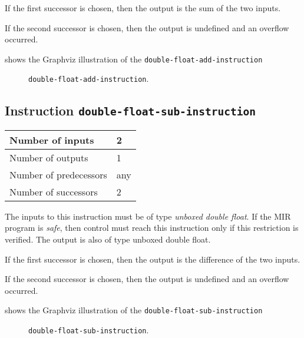 If the first successor is chosen, then the output is
the sum of the two inputs.  

If the second successor is chosen, then the output is undefined and an
overflow occurred. 

 shows the Graphviz illustration of the
\texttt{double-float-add-instruction}

\begin{figure}
\begin{center}
\end{center}
\caption{\label{fig-double-float-add-instruction}
\texttt{double-float-add-instruction}.}
\end{figure}

\subsection{Instruction \texttt{double-float-sub-instruction}}
\label{mir-instruction-double-float-sub}

\begin{tabular}{|l|l|}
\hline
Number of inputs & 2\\
\hline
Number of outputs & 1\\
\hline
Number of predecessors & any\\
\hline
Number of successors & 2\\
\hline
\end{tabular}

The inputs to this instruction must be of type \emph{unboxed double
  float}.  If the MIR program is \emph{safe}, then control must reach
this instruction only if this restriction is verified.  The output is
also of type unboxed double float.

If the first successor is chosen, then the output is
the difference of the two inputs.  

If the second successor is chosen, then the output is undefined and an
overflow occurred. 

 shows the Graphviz illustration of the
\texttt{double-float-sub-instruction}

\begin{figure}
\begin{center}
\end{center}
\caption{\label{fig-double-float-sub-instruction}
\texttt{double-float-sub-instruction}.}
\end{figure}

